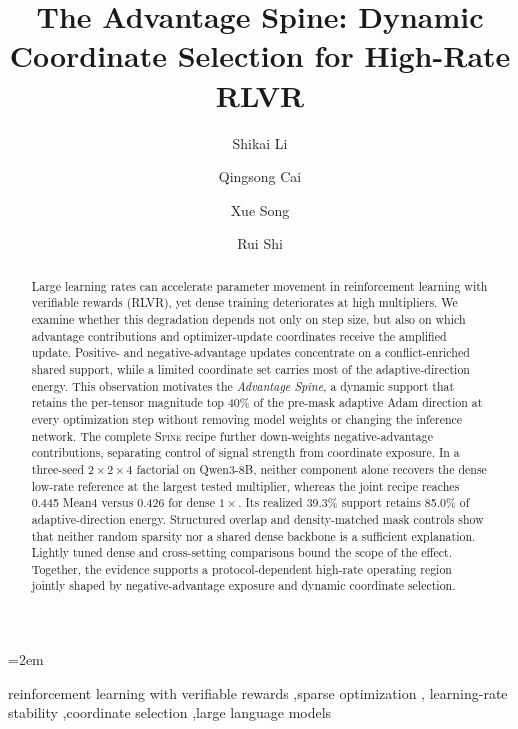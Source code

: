 \documentclass[5p,times]{elsarticle}
\newcommand{\recipe}{\textsc{Spine}}
\begin{document}
\emergencystretch=2em
\begin{frontmatter}
\title{The Advantage Spine: Dynamic Coordinate Selection for High-Rate RLVR}
\author[a]{Shikai Li}
\author[b]{Qingsong Cai}
\author[a]{Xue Song}
\author[a]{Rui Shi}


\begin{abstract}
Large learning rates can accelerate parameter movement in reinforcement
learning with verifiable rewards (RLVR), yet dense training deteriorates at
high multipliers. We examine whether this degradation depends not only on step
size, but also on which advantage contributions and optimizer-update
coordinates receive the amplified update. Positive- and negative-advantage
updates concentrate on a conflict-enriched shared support, while a limited
coordinate set carries most of the adaptive-direction energy. This observation
motivates the \emph{Advantage Spine}, a dynamic support that retains the
per-tensor magnitude top 40\% of the pre-mask adaptive Adam direction at every
optimization step without removing model weights or changing the inference
network. The complete \recipe{} recipe further down-weights
negative-advantage contributions, separating control of signal strength from
coordinate exposure. In a three-seed $2\times2\times4$ factorial on Qwen3-8B,
neither component alone recovers the dense low-rate reference at the largest
tested multiplier, whereas the joint recipe reaches 0.445 Mean4 versus 0.426
for dense $1\times$. Its realized 39.3\% support retains 85.0\% of
adaptive-direction energy. Structured overlap and density-matched mask
controls show that neither random sparsity nor a shared dense backbone is a
sufficient explanation. Lightly tuned dense and cross-setting comparisons
bound the scope of the effect. Together, the evidence supports a
protocol-dependent high-rate operating region jointly shaped by
negative-advantage exposure and dynamic coordinate selection.
\end{abstract}

\begin{keyword}
reinforcement learning with verifiable rewards \sep sparse optimization \sep
learning-rate stability \sep coordinate selection \sep large language models
\end{keyword}
\end{frontmatter}
\end{document}
